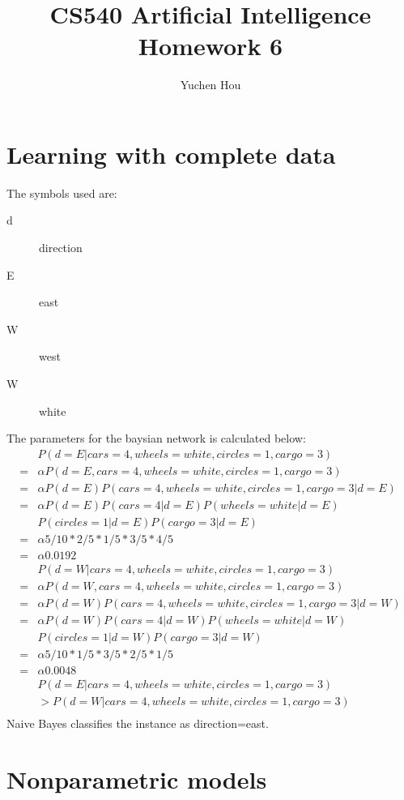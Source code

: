 \documentclass[12pt]{article}
\begin{document}
\title{CS540 Artificial Intelligence Homework 6}
\author{Yuchen Hou}
\maketitle

\section{Learning with complete data}
The symbols used are:
\begin{description}
  \item[d] direction
  \item[E] east
  \item[W] west
  \item[W] white
\end{description}
The parameters for the baysian network is calculated below:
\begin{align*}
  &P(d=E|cars=4,wheels=white,circles=1,cargo=3)\\
  =& \alpha P(d=E,cars=4,wheels=white,circles=1,cargo=3)\\
  =& \alpha P(d=E)P(cars=4,wheels=white,circles=1,cargo=3|d=E)\\
  =& \alpha P(d=E)P(cars=4|d=E)P(wheels=white|d=E)\\
  &P(circles=1|d=E)P(cargo=3|d=E)\\
  =& \alpha 5/10 * 2/5 * 1/5 * 3/5 * 4/5\\
  =& \alpha 0.0192\\
  &P(d=W|cars=4,wheels=white,circles=1,cargo=3)\\
  =& \alpha P(d=W,cars=4,wheels=white,circles=1,cargo=3)\\
  =& \alpha P(d=W)P(cars=4,wheels=white,circles=1,cargo=3|d=W)\\
  =& \alpha P(d=W)P(cars=4|d=W)P(wheels=white|d=W)\\
  &P(circles=1|d=W)P(cargo=3|d=W)\\
  =& \alpha 5/10 * 1/5 * 3/5 * 2/5 * 1/5\\
  =& \alpha 0.0048\\
  &P(d=E|cars=4,wheels=white,circles=1,cargo=3)\\
  &> P(d=W|cars=4,wheels=white,circles=1,cargo=3)\\
\end{align*}
Naive Bayes classifies the instance as direction=east.

\section{Nonparametric models}
\end{document}

